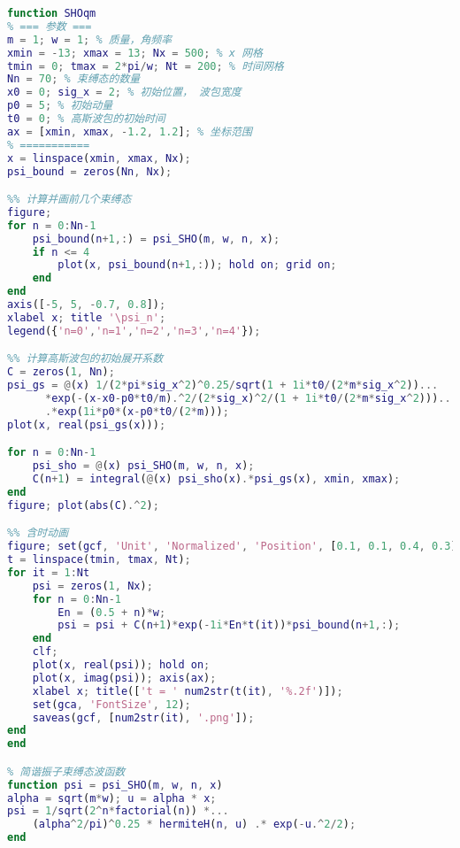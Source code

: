 \begin{lstlisting}[language=matlab, caption=SHOqm.m]
% 高斯波包在简谐振子势阱中运动
function SHOqm
% === 参数 ===
m = 1; w = 1; % 质量，角频率
xmin = -13; xmax = 13; Nx = 500; % x 网格
tmin = 0; tmax = 2*pi/w; Nt = 200; % 时间网格
Nn = 70; % 束缚态的数量
x0 = 0; sig_x = 2; % 初始位置， 波包宽度
p0 = 5; % 初始动量
t0 = 0; % 高斯波包的初始时间
ax = [xmin, xmax, -1.2, 1.2]; % 坐标范围
% ===========
x = linspace(xmin, xmax, Nx);
psi_bound = zeros(Nn, Nx);

%% 计算并画前几个束缚态
figure;
for n = 0:Nn-1
    psi_bound(n+1,:) = psi_SHO(m, w, n, x);
    if n <= 4
        plot(x, psi_bound(n+1,:)); hold on; grid on;
    end
end
axis([-5, 5, -0.7, 0.8]);
xlabel x; title '\psi_n';
legend({'n=0','n=1','n=2','n=3','n=4'});

%% 计算高斯波包的初始展开系数
C = zeros(1, Nn);
psi_gs = @(x) 1/(2*pi*sig_x^2)^0.25/sqrt(1 + 1i*t0/(2*m*sig_x^2))...
      *exp(-(x-x0-p0*t0/m).^2/(2*sig_x)^2/(1 + 1i*t0/(2*m*sig_x^2)))...
      .*exp(1i*p0*(x-p0*t0/(2*m)));
plot(x, real(psi_gs(x)));

for n = 0:Nn-1
    psi_sho = @(x) psi_SHO(m, w, n, x);
    C(n+1) = integral(@(x) psi_sho(x).*psi_gs(x), xmin, xmax);
end
figure; plot(abs(C).^2);

%% 含时动画
figure; set(gcf, 'Unit', 'Normalized', 'Position', [0.1, 0.1, 0.4, 0.3]);
t = linspace(tmin, tmax, Nt);
for it = 1:Nt
    psi = zeros(1, Nx);
    for n = 0:Nn-1
        En = (0.5 + n)*w;
        psi = psi + C(n+1)*exp(-1i*En*t(it))*psi_bound(n+1,:);
    end
    clf;
    plot(x, real(psi)); hold on;
    plot(x, imag(psi)); axis(ax);
    xlabel x; title(['t = ' num2str(t(it), '%.2f')]);
    set(gca, 'FontSize', 12);
    saveas(gcf, [num2str(it), '.png']);
end
end

% 简谐振子束缚态波函数
function psi = psi_SHO(m, w, n, x)
alpha = sqrt(m*w); u = alpha * x;
psi = 1/sqrt(2^n*factorial(n)) *...
    (alpha^2/pi)^0.25 * hermiteH(n, u) .* exp(-u.^2/2);
end
\end{lstlisting}
